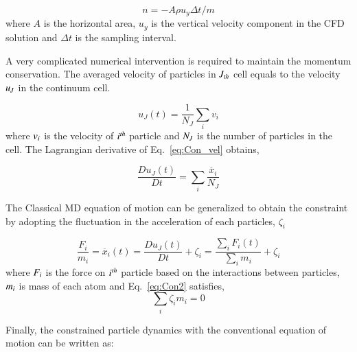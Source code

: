 \documentclass[preprint,12pt]{elsarticle}
\begin{document}
\vspace{-.2em}
\begin{equation}
n = -A \rho u_y \Delta t / m
 \label{eq:Mass_Flux}
\end{equation}
\normalsize
where $A$ is the horizontal area, $u_y$ is the vertical velocity component in the CFD solution and $\Delta t$ is the sampling interval.

A very complicated numerical intervention is required to maintain the momentum conservation. The averaged velocity of particles in $\it J_{th}$ cell equals to the velocity $\it u_{J}$ in the continuum cell.

\vspace{-.2em}
\begin{equation}
 u_{J}(t) = \frac{1}{N_{J}} \displaystyle\sum_{i} v_{i}
 \label{eq:Con_vel}
\end{equation}
\normalsize
where $\it v_{i}$ is the velocity of $\it i^{th}$ particle and $\it N_{J}$ is the number of particles in the cell. The Lagrangian derivative of Eq.~\ref{eq:Con_vel} obtains,

\vspace{-.2em}
\begin{equation}
 \frac{Du_{J}(t)}{Dt} =  \displaystyle\sum_{i} \frac{\ddot{x_{i}}}{N_{J}}
 \label{eq:Lagrangian}
\end{equation}
\normalsize

The Classical MD equation of motion can be generalized to obtain the constraint by adopting the fluctuation in the acceleration of each particles, $\zeta_{i}$

\vspace{-.2em}
\begin{equation}
 \frac{F_{i}}{m_{i}} = \ddot{x_{i}}(t)  =   \frac{Du_{J}(t)}{Dt} + \zeta_{i} = \frac{\displaystyle\sum_{i}F_{i}(t)} {\displaystyle\sum_{i}m_{i}} +   \zeta_{i}
 \label{eq:Con2}
\end{equation}
\normalsize
where $\it F_{i}$ is the force on $\it i^{th}$ particle based on the interactions between particles,  $\it m_{i}$ is mass of each atom and  Eq.~\ref{eq:Con2} satisfies,
\vspace{-.2em}
\begin{equation}
\displaystyle\sum_{i}\zeta_{i}m_{i} = 0
 \label{eq:Con2}
\end{equation}
\normalsize

Finally, the constrained particle dynamics with the conventional equation of motion can be written as:
\end{document}
